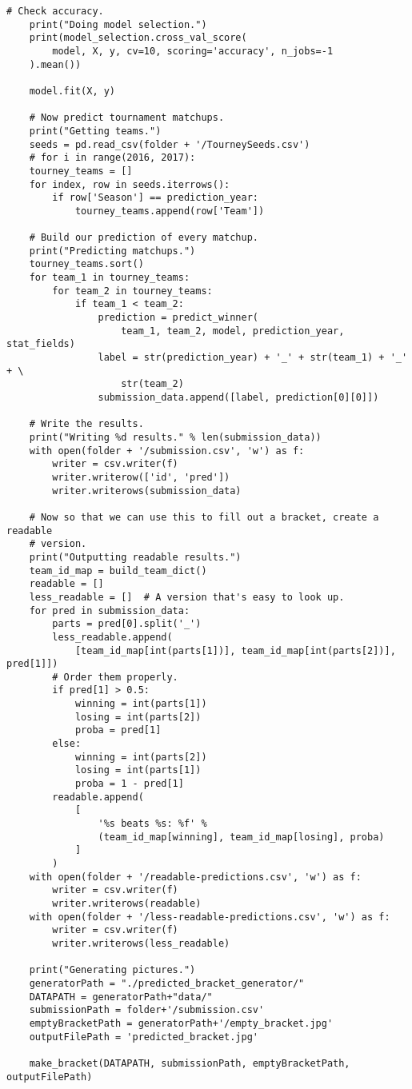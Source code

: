 \documentclass[onecolumn, draftclsnofoot,10pt, compsoc]{IEEEtran}
\begin{document}
\begin{lstlisting}[caption={mm.py, where basketball statistics are read and fed into Scikit-Learn machine learning algorithms. Then, the resulting March Madness bracket is generated.}]
    # Check accuracy.
    print("Doing model selection.")
    print(model_selection.cross_val_score(
        model, X, y, cv=10, scoring='accuracy', n_jobs=-1
    ).mean())

    model.fit(X, y)

    # Now predict tournament matchups.
    print("Getting teams.")
    seeds = pd.read_csv(folder + '/TourneySeeds.csv')
    # for i in range(2016, 2017):
    tourney_teams = []
    for index, row in seeds.iterrows():
        if row['Season'] == prediction_year:
            tourney_teams.append(row['Team'])

    # Build our prediction of every matchup.
    print("Predicting matchups.")
    tourney_teams.sort()
    for team_1 in tourney_teams:
        for team_2 in tourney_teams:
            if team_1 < team_2:
                prediction = predict_winner(
                    team_1, team_2, model, prediction_year, stat_fields)
                label = str(prediction_year) + '_' + str(team_1) + '_' + \
                    str(team_2)
                submission_data.append([label, prediction[0][0]])

    # Write the results.
    print("Writing %d results." % len(submission_data))
    with open(folder + '/submission.csv', 'w') as f:
        writer = csv.writer(f)
        writer.writerow(['id', 'pred'])
        writer.writerows(submission_data)

    # Now so that we can use this to fill out a bracket, create a readable
    # version.
    print("Outputting readable results.")
    team_id_map = build_team_dict()
    readable = []
    less_readable = []  # A version that's easy to look up.
    for pred in submission_data:
        parts = pred[0].split('_')
        less_readable.append(
            [team_id_map[int(parts[1])], team_id_map[int(parts[2])], pred[1]])
        # Order them properly.
        if pred[1] > 0.5:
            winning = int(parts[1])
            losing = int(parts[2])
            proba = pred[1]
        else:
            winning = int(parts[2])
            losing = int(parts[1])
            proba = 1 - pred[1]
        readable.append(
            [
                '%s beats %s: %f' %
                (team_id_map[winning], team_id_map[losing], proba)
            ]
        )
    with open(folder + '/readable-predictions.csv', 'w') as f:
        writer = csv.writer(f)
        writer.writerows(readable)
    with open(folder + '/less-readable-predictions.csv', 'w') as f:
        writer = csv.writer(f)
        writer.writerows(less_readable)

    print("Generating pictures.")
    generatorPath = "./predicted_bracket_generator/"
    DATAPATH = generatorPath+"data/"
    submissionPath = folder+'/submission.csv'
    emptyBracketPath = generatorPath+'/empty_bracket.jpg'
    outputFilePath = 'predicted_bracket.jpg'

    make_bracket(DATAPATH, submissionPath, emptyBracketPath, outputFilePath)
\end{lstlisting}
\end{document}

